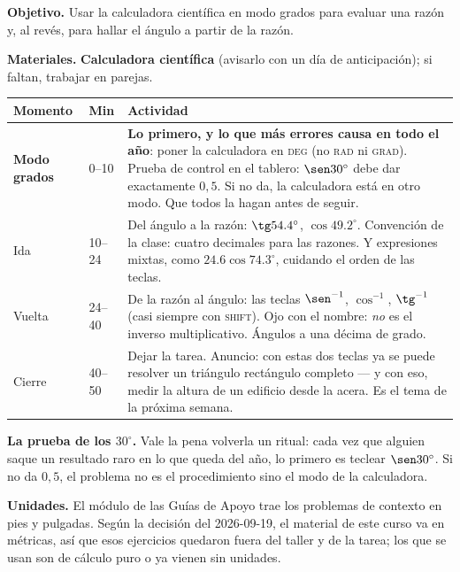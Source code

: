 \documentclass[11pt]{article}
\begin{document}

\textbf{Objetivo.} Usar la calculadora científica en modo grados para evaluar una razón y,
al revés, para hallar el ángulo a partir de la razón.

\textbf{Materiales.} \textbf{Calculadora científica} (avisarlo con un día de anticipación);
si faltan, trabajar en parejas.

\begin{center}
{\renewcommand{\arraystretch}{1.3}
\begin{tabularx}{\linewidth}{@{}l l X@{}}
  \toprule
  \textbf{Momento} & \textbf{Min} & \textbf{Actividad}\\
  \midrule
  \textbf{Modo grados} & 0--10 & \textbf{Lo primero, y lo que más errores causa en todo el
    año}: poner la calculadora en \textsc{deg} (no \textsc{rad} ni \textsc{grad}). Prueba
    de control en el tablero: $\sen 30^\circ$ debe dar exactamente $0{,}5$. Si no da,
    la calculadora está en otro modo. Que todos la hagan antes de seguir.\\
  Ida & 10--24 & Del ángulo a la razón: $\tg \num{54,4}^\circ$, $\cos \num{49,2}^\circ$.
    Convención de la clase: cuatro decimales para las razones. Y expresiones mixtas, como
    $\num{24,6}\cos\num{74,3}^\circ$, cuidando el orden de las teclas.\\
  Vuelta & 24--40 & De la razón al ángulo: las teclas $\sen^{-1}$, $\cos^{-1}$,
    $\tg^{-1}$ (casi siempre con \textsc{shift}). Ojo con el nombre: \emph{no} es el
    inverso multiplicativo. Ángulos a una décima de grado.\\
  Cierre & 40--50 & Dejar la tarea. Anuncio: con estas dos teclas ya se puede resolver un
    triángulo rectángulo completo — y con eso, medir la altura de un edificio desde la
    acera. Es el tema de la próxima semana.\\
  \bottomrule
\end{tabularx}}
\end{center}

\begin{nota}
\textbf{La prueba de los $30^\circ$.} Vale la pena volverla un ritual: cada vez que alguien
saque un resultado raro en lo que queda del año, lo primero es teclear $\sen 30^\circ$. Si no
da $0{,}5$, el problema no es el procedimiento sino el modo de la calculadora.
\end{nota}

\begin{nota}
\textbf{Unidades.} El módulo de las Guías de Apoyo trae los problemas de contexto en pies y
pulgadas. Según la decisión del 2026-09-19, el material de este curso va en métricas, así que
esos ejercicios quedaron fuera del taller y de la tarea; los que se usan son de cálculo puro o
ya vienen sin unidades.
\end{nota}
\end{document}
